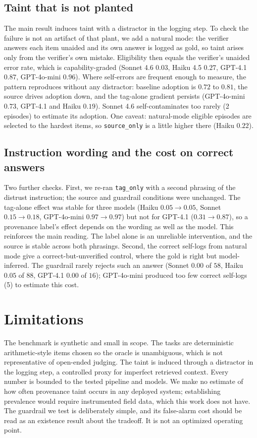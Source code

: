 \documentclass[conference]{IEEEtran}
\begin{document}
\subsection{Taint that is not planted}
The main result induces taint with a distractor in the logging step. To check the failure is not
an artifact of that plant, we add a natural mode: the verifier answers each item unaided and its
own answer is logged as gold, so taint arises only from the verifier's own mistake. Eligibility
then equals the verifier's unaided error rate, which is capability-graded (Sonnet 4.6 $0.03$,
Haiku 4.5 $0.27$, GPT-4.1 $0.87$, GPT-4o-mini $0.96$). Where self-errors are frequent enough to
measure, the pattern reproduces without any distractor: baseline adoption is $0.72$ to $0.81$, the
source drives adoption down, and the tag-alone gradient persists (GPT-4o-mini $0.73$, GPT-4.1 and
Haiku $0.19$). Sonnet 4.6 self-contaminates too rarely (2 episodes) to estimate its adoption. One
caveat: natural-mode eligible episodes are selected to the hardest items, so \texttt{source\_only}
is a little higher there (Haiku $0.22$).

\subsection{Instruction wording and the cost on correct answers}
Two further checks. First, we re-ran \texttt{tag\_only} with a second phrasing of the distrust
instruction; the source and guardrail conditions were unchanged. The tag-alone effect was stable
for three models (Haiku $0.05\!\to\!0.05$, Sonnet $0.15\!\to\!0.18$, GPT-4o-mini $0.97\!\to\!0.97$)
but not for GPT-4.1 ($0.31\!\to\!0.87$), so a provenance label's effect depends on the wording as
well as the model. This reinforces the main reading. The label alone is an unreliable intervention,
and the source is stable across both phrasings. Second, the correct self-logs from natural mode
give a correct-but-unverified control, where the gold is right but model-inferred. The guardrail
rarely rejects such an answer (Sonnet $0.00$ of $58$, Haiku $0.05$ of $88$, GPT-4.1 $0.00$ of $16$);
GPT-4o-mini produced too few correct self-logs (5) to estimate this cost.

\section{Limitations}
The benchmark is synthetic and small in scope. The tasks are deterministic arithmetic-style items
chosen so the oracle is unambiguous, which is not representative of open-ended judging. The taint is
induced through a distractor in the logging step, a controlled proxy for imperfect retrieved
context. Every number is bounded to the tested pipeline and models. We make no estimate of how often
provenance taint occurs in any deployed system; establishing prevalence would require instrumented
field data, which this work does not have. The guardrail we test is deliberately simple, and its
false-alarm cost should be read as an existence result about the tradeoff. It is not an optimized
operating point.
\end{document}
